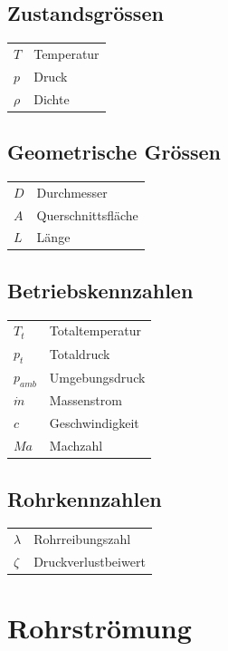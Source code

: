 \documentclass[a4paper,10pt,twocolumn]{article}
\begin{document}
\subsection{Zustandsgrössen}

\begin{tabular}{ l l }
 $T$ & Temperatur \\
 $p$ & Druck \\
 $\rho$ & Dichte \\
\end{tabular}

\subsection{Geometrische Grössen}

\begin{tabular}{ l l }
 $D$ & Durchmesser \\
 $A$ & Querschnittsfläche \\
 $L$ & Länge \\
\end{tabular}

\subsection{Betriebskennzahlen}

\begin{tabular}{ l l }
 $T_t$ & Totaltemperatur \\
 $p_t$ & Totaldruck \\
 $p_{amb}$ & Umgebungsdruck \\
 $\dot m$ & Massenstrom \\
 $c$ & Geschwindigkeit \\
 $\mathit{Ma}$ & Machzahl \\
\end{tabular}

\subsection{Rohrkennzahlen}

\begin{tabular}{ l l }
 $\lambda$ & Rohrreibungszahl \\
 $\zeta$   & Druckverlustbeiwert \\
\end{tabular}


\section{Rohrströmung}
\end{document}
